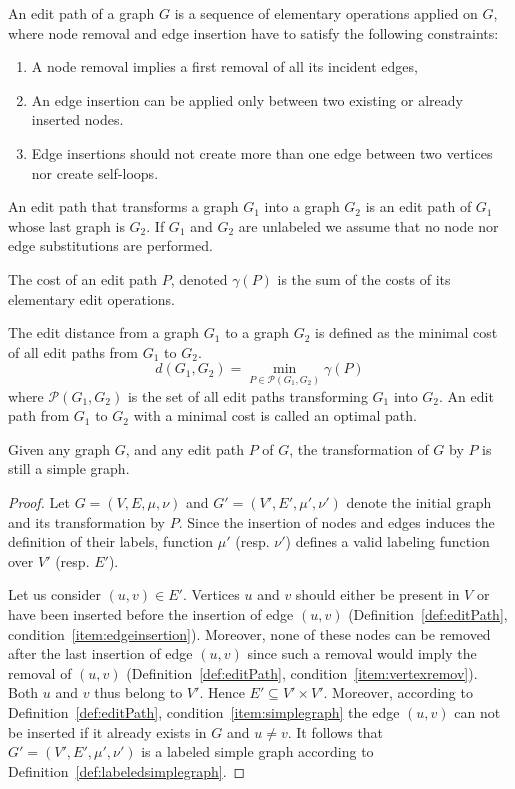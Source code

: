 \begin{definition}\label{def:editPath}
  An edit path of a graph $G$ is a sequence of elementary
    operations applied on $G$, where node removal and edge
    insertion have to satisfy the following constraints:
    \begin{enumerate}
    \item\label{item:vertexremov} A node removal implies a first removal of all its incident
      edges,
    \item\label{item:edgeinsertion} An edge insertion can be applied
      only between two existing or already inserted nodes. 
    \item\label{item:simplegraph} Edge insertions should not create
      more than one edge between two vertices nor create self-loops.
    \end{enumerate}
  An edit path that transforms a graph $G_1$ into a graph $G_2$ is an edit
    path of $G_1$ whose last graph is $G_2$. If $G_1$ and $G_2$ are unlabeled we assume that no node nor edge
  substitutions are performed.
\end{definition}
\begin{definition}
  The cost of an edit path $P$, denoted $\gamma(P)$ is the sum of
  the costs of its elementary edit operations.
\end{definition}
\begin{definition}
  The edit distance from a graph $G_1$ to a graph $G_2$ is defined as
  the minimal cost of all edit paths from $G_1$ to $G_2$.
  \[
  d(G_1,G_2)=\min_{P\in \mathcal{P}(G_1,G_2)} \gamma(P)
  \]
  where $\mathcal{P}(G_1,G_2)$ is the set of all edit paths
  transforming $G_1$ into $G_2$. An edit path from $G_1$ to $G_2$ with a
  minimal cost is called an optimal path.
\end{definition}
\begin{proposition}
  \label{prop:resultEditPath}
  Given any graph $G$, and any edit path $P$ of $G$, the
  transformation of $G$ by $P$ is still a simple graph. 
\end{proposition}
\begin{proof}
  Let $G=(V,E,\mu,\nu)$ and $G'=(V',E',\mu',\nu')$ denote the
  initial graph and its transformation by $P$. Since the insertion
  of nodes and edges induces the definition of their labels,
  function $\mu'$ (resp. $\nu'$) defines a valid labeling function
  over $V'$ (resp. $E'$). 

  Let us consider $(u,v)\in E'$. Vertices $u$ and $v$ should either be
  present in $V$ or have been inserted before the insertion of edge
  $(u,v)$ (Definition~\ref{def:editPath},
  condition~\ref{item:edgeinsertion}). Moreover, none of these nodes
  can be removed after the last insertion of edge $(u,v)$ since such a
  removal would imply the removal of $(u,v)$
  (Definition~\ref{def:editPath}, condition~\ref{item:vertexremov}).
  Both $u$ and $v$ thus belong to $V'$.
Hence  $E'\subseteq V'\times V'$. Moreover, according to
  Definition~\ref{def:editPath}, condition~\ref{item:simplegraph} the
  edge $(u,v)$ can not be inserted if it already exists in $G$ and
  $u\neq v$.  It follows that $G'=(V',E',\mu',\nu')$ is a labeled
  simple graph according to Definition~\ref{def:labeledsimplegraph}.
\end{proof}

